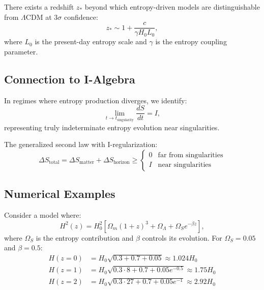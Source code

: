 \begin{theorem}
There exists a redshift $z_*$ beyond which entropy-driven models are distinguishable from $\Lambda$CDM at $3\sigma$ confidence:
\[
z_* \sim 1 + \frac{c}{\gamma H_0 L_0},
\]
where $L_0$ is the present-day entropy scale and $\gamma$ is the entropy coupling parameter.
\end{theorem}

\subsection{Connection to I-Algebra}

\begin{definition}
In regimes where entropy production diverges, we identify:
\[
\lim_{t \to t_{\text{singularity}}} \frac{dS}{dt} = I,
\]
representing truly indeterminate entropy evolution near singularities.
\end{definition}

\begin{proposition}
The generalized second law with I-regularization:
\[
\Delta S_{\text{total}} = \Delta S_{\text{matter}} + \Delta S_{\text{horizon}} \geq \begin{cases}
0 & \text{far from singularities} \\
I & \text{near singularities}
\end{cases}
\]
\end{proposition}

\subsection{Numerical Examples}

\begin{example}
Consider a model where:
\[
H^2(z) = H_0^2[\Omega_m(1+z)^3 + \Omega_{\Lambda} + \Omega_S e^{-\beta z}],
\]
where $\Omega_S$ is the entropy contribution and $\beta$ controls its evolution. For $\Omega_S = 0.05$ and $\beta = 0.5$:
\begin{align*}
H(z=0) &= H_0\sqrt{0.3 + 0.7 + 0.05} \approx 1.024 H_0 \\
H(z=1) &= H_0\sqrt{0.3 \cdot 8 + 0.7 + 0.05 e^{-0.5}} \approx 1.75 H_0 \\
H(z=2) &= H_0\sqrt{0.3 \cdot 27 + 0.7 + 0.05 e^{-1}} \approx 2.92 H_0
\end{align*}
\end{example}

